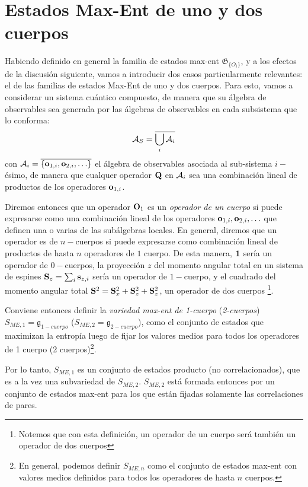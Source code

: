 \documentclass{report} %
\numberwithin{equation}{section}
\begin{document}
\section{Estados Max-Ent de uno y dos cuerpos}

Habiendo definido en general la familia de estados max-ent $\mathfrak{G}_{\{O_i\}}$, y a los efectos de la discusión siguiente, vamos a introducir dos casos particularmente relevantes: el de las familias de estados Max-Ent de uno y dos cuerpos. Para esto, vamos a considerar un sistema cuántico compuesto, de manera que su álgebra de observables sea generada por las álgebras de observables en cada subsistema que lo conforma:
$$
{\cal A}_S = \overline{\bigcup_i {\cal A}_i}
$$
con ${\cal A}_i=\overline{\{{\bf o}_{1,i},{\bf o}_{2,i},\ldots\}}$ el álgebra de observables asociada al sub-sistema $i-$ésimo, de manera que cualquer operador ${\bf Q}$ en ${\cal A}_i$ sea una combinación lineal de productos de los operadores ${\bf o}_{1,i}$.

Diremos entonces que un operador ${\bf O}_1$ es un \emph{operador de un cuerpo} si puede expresarse como una combinación lineal de los operadores ${\bf o}_{1,i},{\bf o}_{2,i},\ldots$ que definen una o varias de las subálgebras locales. En general, diremos que un operador es de $n-$cuerpos si puede expresarse como combinación lineal de productos de hasta $n$ operadores de $1$ cuerpo. De esta manera, ${\bf 1}$ sería un operador de $0-$cuerpos, la proyección $z$ del momento angular total en un sistema de espines ${\bf S}_z=\sum_i {\bf s}_{z,i}$ sería un operador de $1-$cuerpo, y el cuadrado del momento angular total ${\bf S}^2={\bf S}_x^2+{\bf S}_z^2+{\bf S}_z^2$, un operador de dos cuerpos \footnote{Notemos que con esta definición, un operador de un cuerpo será también un operador de dos cuerpos}.

Conviene entonces definir la \emph{variedad max-ent de 1-cuerpo} (\emph{2-cuerpos})  $S_{ME, 1}=\mathfrak{g}_{1-cuerpo}$ ($S_{ME, 2}=\mathfrak{g}_{2-cuerpo}$), como el conjunto de estados que maximizan la entropía luego de fijar los valores medios para todos los operadores de 1 cuerpo (2 cuerpos)\footnote{En general, podemos definir $S_{ME, n}$ como el conjunto de estados max-ent con valores medios definidos para todos los operadores de hasta $n$ cuerpos.}.

Por lo tanto, $S_{ME, 1}$ es un conjunto de estados producto (no correlacionados), que es a la vez una subvariedad de $S_{ME, 2}$.
$S_{ME, 2}$ está formada entonces por un conjunto de estados max-ent para los que están fijadas solamente las correlaciones de pares. 
\end{document}
